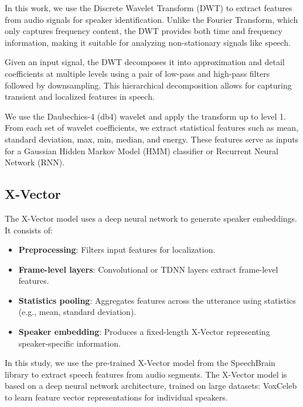\documentclass[conference]{IEEEtran}
\begin{document}
In this work, we use the Discrete Wavelet Transform (DWT) to extract features
from audio signals for speaker identification. Unlike the Fourier Transform,
which only captures frequency content, the DWT provides both time and frequency information, making it suitable for analyzing non-stationary signals like speech.

Given an input signal, the DWT decomposes it into approximation and detail
coefficients at multiple levels using a pair of low-pass and high-pass filters followed by downsampling. This hierarchical decomposition allows for capturing transient and localized features in speech.

We use the Daubechies-4 (db4) wavelet and apply the transform up to level 1.
From each set of wavelet coefficients, we extract statistical features such as mean, standard deviation, max, min, median, and energy. These features serve as inputs for a Gaussian Hidden Markov Model (HMM) classifier or Recurrent Neural Network (RNN). \cite{tufekci2000dwt}















\subsection{X-Vector}

The X-Vector model uses a deep neural network to generate speaker embeddings. It consists of:

\begin{itemize} \item \textbf{Preprocessing}: Filters input features for localization.
    \item \textbf{Frame-level layers}: Convolutional or TDNN layers extract
          frame-level features. \item \textbf{Statistics pooling}: Aggregates
          features across the utterance using statistics (e.g., mean, standard deviation).
    \item \textbf{Speaker embedding}: Produces a fixed-length X-Vector
          representing speaker-specific information. \end{itemize}


In this study, we use the pre-trained X-Vector model from the SpeechBrain
library to extract speech features from audio segments. The X-Vector model
is based on a deep neural network architecture, trained on large
datasets: VoxCeleb to learn feature vector representations
for individual speakers.
\end{document}
